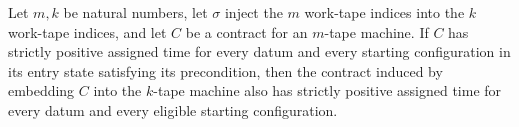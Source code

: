 \begin{theorem}
\label{Turing.Contract.embed_positive}
\leanok
{}
Let $m,k$ be natural numbers, let $\sigma$ inject the $m$ work-tape indices into the $k$
work-tape indices, and let $C$ be a contract for an $m$-tape machine. If $C$ has
strictly positive assigned time for every datum and every starting configuration in its
entry state satisfying its precondition, then the contract induced by embedding $C$ into
the $k$-tape machine also has strictly positive assigned time for every datum and every
eligible starting configuration.
\end{theorem}

